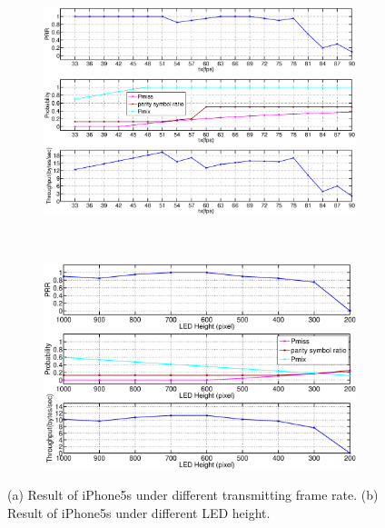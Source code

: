 \begin{figure}[!t]
	\begin{subfigure}[h]{0.3\textwidth}
	  \includegraphics[width=\textwidth]{fig/exp3_iphone5s_new_modify.eps}
	  \caption{}
	  \label{fig:exp3_3}
	\end{subfigure}
	~
	\begin{subfigure}[h]{0.3\textwidth}
	  \includegraphics[width=\textwidth]{fig/exp4_iphone5s_new.eps}
	  \caption{}
  	  \label{fig:exp4_2}
	\end{subfigure}
    \caption{(a) Result of iPhone5s under different transmitting frame rate. (b) Result of iPhone5s under different LED height.}
    \label{}
\end{figure}

